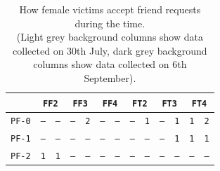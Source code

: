 \begin{table}[H]
	\centering
	\caption{How female victims accept friend requests during the time. \\ (Light grey background columns show data collected on 30th July, dark grey background columns show data collected on 6th September).}
	\label{table:female-accept}
	\begin{tabular}[c]{ |c|c|c|c|c|c|c|c|c|c|c|c|c| } 
		\hline
		\backslashbox{\phantom{"}}{\phantom{"}} &  			
		\multicolumn{2}{|c|}{\cellcolor[HTML]{FFFFFF}\texttt{FF2}} & 
		\multicolumn{2}{|c|}{\cellcolor[HTML]{FFFFFF}\texttt{FF3}} &
		\multicolumn{2}{|c|}{\cellcolor[HTML]{FFFFFF}\texttt{FF4}} & 
		\multicolumn{2}{|c|}{\cellcolor[HTML]{FFFFFF}\texttt{FT2}} & 
		\multicolumn{2}{|c|}{\cellcolor[HTML]{FFFFFF}\texttt{FT3}} &
		\multicolumn{2}{|c|}{\cellcolor[HTML]{FFFFFF}\texttt{FT4}} \\
		\hline 
		\cellcolor[HTML]{FFFFFF}\texttt{PF-0} & 
		\cellcolor[HTML]{F5F5F5}\texttt{--} & \cellcolor[HTML]{D3D3D3}\texttt{--} &
		\cellcolor[HTML]{F5F5F5}\texttt{--} & \cellcolor[HTML]{D3D3D3}\texttt{2} &
		\cellcolor[HTML]{F5F5F5}\texttt{--} & \cellcolor[HTML]{D3D3D3}\texttt{--} & 
		\cellcolor[HTML]{F5F5F5}\texttt{--} & \cellcolor[HTML]{D3D3D3}\texttt{1} &
		\cellcolor[HTML]{F5F5F5}\texttt{--} & \cellcolor[HTML]{D3D3D3}\texttt{1} &
		\cellcolor[HTML]{F5F5F5}\texttt{1} & \cellcolor[HTML]{D3D3D3}\texttt{2} \\
		\hline
		\cellcolor[HTML]{FFFFFF}\texttt{PF-1} & 
		\cellcolor[HTML]{F5F5F5}\texttt{--} & \cellcolor[HTML]{D3D3D3}\texttt{--} &
		\cellcolor[HTML]{F5F5F5}\texttt{--} & \cellcolor[HTML]{D3D3D3}\texttt{--} &
		\cellcolor[HTML]{F5F5F5}\texttt{--} & \cellcolor[HTML]{D3D3D3}\texttt{--} & 
		\cellcolor[HTML]{F5F5F5}\texttt{--} & \cellcolor[HTML]{D3D3D3}\texttt{--} &
		\cellcolor[HTML]{F5F5F5}\texttt{--} & \cellcolor[HTML]{D3D3D3}\texttt{1} &
		\cellcolor[HTML]{F5F5F5}\texttt{1} & \cellcolor[HTML]{D3D3D3}\texttt{1} \\
		\hline 
		\cellcolor[HTML]{FFFFFF}\texttt{PF-2} & 
		\cellcolor[HTML]{F5F5F5}\texttt{1} & \cellcolor[HTML]{D3D3D3}\texttt{1} &
		\cellcolor[HTML]{F5F5F5}\texttt{--} & \cellcolor[HTML]{D3D3D3}\texttt{--} &
		\cellcolor[HTML]{F5F5F5}\texttt{--} & \cellcolor[HTML]{D3D3D3}\texttt{--} & 
		\cellcolor[HTML]{F5F5F5}\texttt{--} & \cellcolor[HTML]{D3D3D3}\texttt{--} &
		\cellcolor[HTML]{F5F5F5}\texttt{--} & \cellcolor[HTML]{D3D3D3}\texttt{--} &
		\cellcolor[HTML]{F5F5F5}\texttt{--} & \cellcolor[HTML]{D3D3D3}\texttt{--} \\
		\hline 

\end{tabular}
\end{table}
